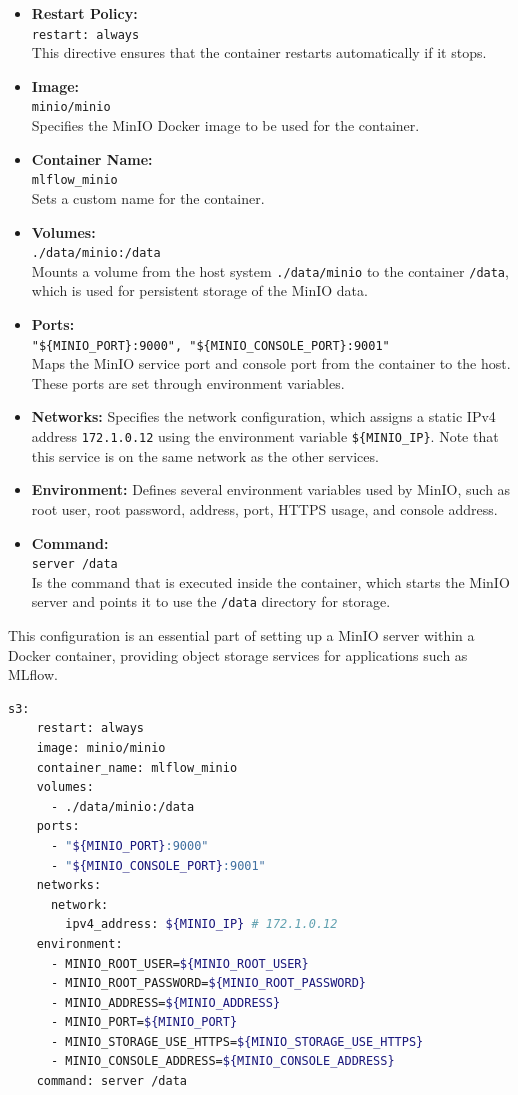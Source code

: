 \begin{itemize}
    \item \textbf{Restart Policy:} \\ \verb|restart: always| \\ This directive ensures that the container restarts automatically if it stops.
    \item \textbf{Image:} \\ \verb|minio/minio| \\
    Specifies the MinIO Docker image to be used for the container.
    \item \textbf{Container Name: } \\ \verb|mlflow_minio| \\ 
    Sets a custom name for the container.
    \item \textbf{Volumes:} \\ \verb|./data/minio:/data| \\ 
    Mounts a volume from the host system \texttt{./data/minio} to the container \texttt{/data}, which is used for persistent storage of the MinIO data.
    \item \textbf{Ports:} \\ \verb|"${MINIO_PORT}:9000", "${MINIO_CONSOLE_PORT}:9001"| \\
    Maps the MinIO service port and console port from the container to the host. These ports are set through environment variables.
    \item \textbf{Networks:}  Specifies the network configuration, which assigns a static IPv4 address \texttt{172.1.0.12} using the environment variable \verb|${MINIO_IP}|. Note that this service is on the same network as the other services.
    \item \textbf{Environment:} Defines several environment variables used by MinIO, such as root user, root password, address, port, HTTPS usage, and console address.
    \item \textbf{Command:} \\ \verb|server /data| \\ Is the command that is executed inside the container, which starts the MinIO server and points it to use the \verb|/data| directory for storage.
\end{itemize}

This configuration is an essential part of setting up a MinIO server within a Docker container, providing object storage services for applications such as MLflow.

\begin{lstlisting}[language=bash, caption=Docker Compose Minio, label={lst:minio_docker}]
s3:
    restart: always
    image: minio/minio
    container_name: mlflow_minio
    volumes:
      - ./data/minio:/data
    ports:
      - "${MINIO_PORT}:9000"
      - "${MINIO_CONSOLE_PORT}:9001"
    networks:
      network:
        ipv4_address: ${MINIO_IP} # 172.1.0.12
    environment:
      - MINIO_ROOT_USER=${MINIO_ROOT_USER}
      - MINIO_ROOT_PASSWORD=${MINIO_ROOT_PASSWORD}
      - MINIO_ADDRESS=${MINIO_ADDRESS}
      - MINIO_PORT=${MINIO_PORT}
      - MINIO_STORAGE_USE_HTTPS=${MINIO_STORAGE_USE_HTTPS}
      - MINIO_CONSOLE_ADDRESS=${MINIO_CONSOLE_ADDRESS}
    command: server /data
\end{lstlisting}

